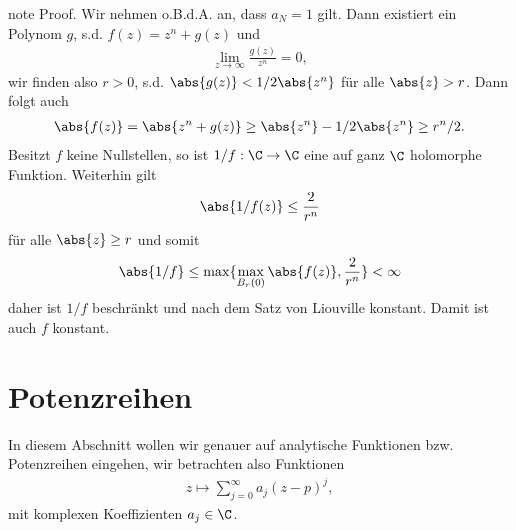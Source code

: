\documentclass[letterpaper,10pt,german]{jupyterBook}
\begin{document}
\begin{sphinxadmonition}{note}
\sphinxAtStartPar
Proof. Wir nehmen o.B.d.A. an, dass \(a_N=1\) gilt. Dann existiert ein Polynom \(g\), s.d. \(f(z) = z^n + g(z)\) und
\begin{equation*}
\begin{split}\lim_{z\to\infty} \frac{g(z)}{z^n} = 0,\end{split}
\end{equation*}
\sphinxAtStartPar
wir finden also \(r>0\), s.d. \(\abs{g(z)} < 1/2 \abs{z^n}\) für alle \(\abs{z}>r\). Dann folgt auch
\begin{equation*}
\begin{split}\abs{f(z)} = \abs{z^n + g(z)} \geq \abs{z^n} - 1/2 \abs{z^n}\geq r^n/2.\end{split}
\end{equation*}
\sphinxAtStartPar
Besitzt \(f\) keine Nullstellen, so ist \(1/f:\C\to\C\) eine auf ganz \(\C\) holomorphe Funktion. Weiterhin gilt
\begin{equation*}
\begin{split}\abs{1/f(z)} \leq \frac{2}{r^n}\end{split}
\end{equation*}
\sphinxAtStartPar
für alle \(\abs{z}\geq r\) und somit
\begin{equation*}
\begin{split}\abs{1/f} \leq \max\{\max_{B_r(0)} \abs{f(z)}, \frac{2}{r^n} \} < \infty\end{split}
\end{equation*}
\sphinxAtStartPar
daher ist \(1/f\) beschränkt und nach dem Satz von Liouville konstant. Damit ist auch \(f\) konstant.
\end{sphinxadmonition}


\section{Potenzreihen}
\label{\detokenize{complexanalysis/powerseries:potenzreihen}}\label{\detokenize{complexanalysis/powerseries::doc}}
\sphinxAtStartPar
In diesem Abschnitt wollen wir genauer auf analytische Funktionen bzw. Potenzreihen eingehen, wir betrachten also Funktionen
\begin{equation*}
\begin{split}z\mapsto \sum_{j=0}^{\infty} a_j (z-p)^j,\end{split}
\end{equation*}
\sphinxAtStartPar
mit komplexen Koeffizienten \(a_j\in\C\).
\end{document}
